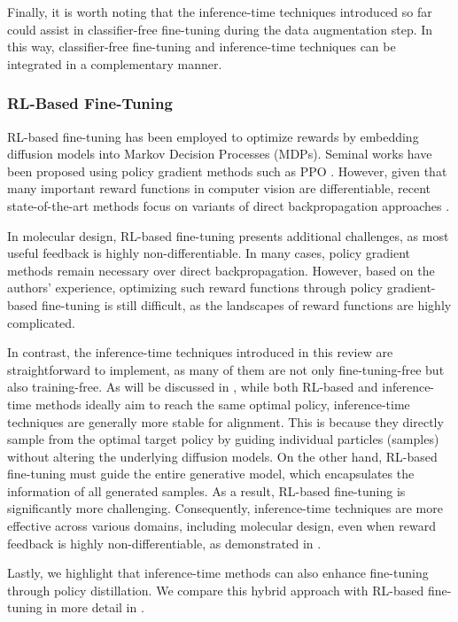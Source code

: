 { Finally, it is worth noting that the inference-time techniques introduced so far could assist in classifier-free fine-tuning during the data augmentation step. In this way, classifier-free fine-tuning and inference-time techniques can be integrated in a complementary manner.} 

\subsubsection{RL-Based Fine-Tuning}

RL-based fine-tuning has been employed to optimize rewards by embedding diffusion models into Markov Decision Processes (MDPs). Seminal works have been proposed using policy gradient methods such as PPO \citep{fan2023dpok,black2023training}. However, given that many important reward functions in computer vision are differentiable, recent state-of-the-art methods focus on variants of direct backpropagation approaches \citep{clark2023directly,prabhudesai2023aligning}.

In molecular design, RL-based fine-tuning presents additional challenges, as most useful feedback is highly non-differentiable. In many cases, policy gradient methods remain necessary over direct backpropagation. However, based on the authors' experience, optimizing such reward functions through policy gradient-based fine-tuning is still difficult, as the landscapes of reward functions are highly complicated. 

In contrast, the inference-time techniques introduced in this review are straightforward to implement, as many of them are not only fine-tuning-free but also training-free. As will be discussed in , while both RL-based and inference-time methods ideally aim to reach the same optimal policy, inference-time techniques are generally more stable for alignment. This is because they directly sample from the optimal target policy by guiding individual particles (samples) without altering the underlying diffusion models. On the other hand, RL-based fine-tuning must guide the entire generative model, which encapsulates the information of all generated samples. As a result, RL-based fine-tuning is significantly more challenging. Consequently, inference-time techniques are more effective across various domains, including molecular design, even when reward feedback is highly non-differentiable, as demonstrated in \citet{li2024derivative}.

Lastly, we highlight that inference-time methods can also enhance fine-tuning through policy distillation. We compare this hybrid approach with RL-based fine-tuning in more detail in .



